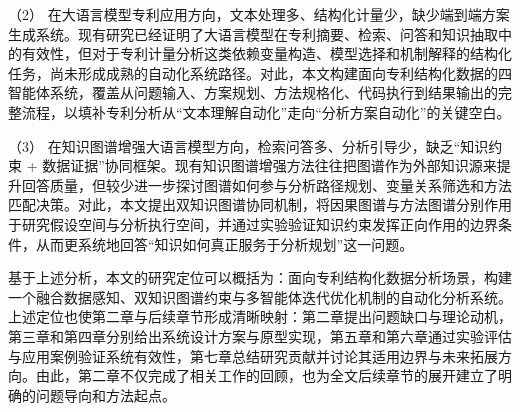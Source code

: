 （2） 在大语言模型专利应用方向，文本处理多、结构化计量少，缺少端到端方案生成系统。现有研究已经证明了大语言模型在专利摘要、检索、问答和知识抽取中的有效性，但对于专利计量分析这类依赖变量构造、模型选择和机制解释的结构化任务，尚未形成成熟的自动化系统路径。对此，本文构建面向专利结构化数据的四智能体系统，覆盖从问题输入、方案规划、方法规格化、代码执行到结果输出的完整流程，以填补专利分析从“文本理解自动化”走向“分析方案自动化”的关键空白。

（3） 在知识图谱增强大语言模型方向，检索问答多、分析引导少，缺乏“知识约束 + 数据证据”协同框架。现有知识图谱增强方法往往把图谱作为外部知识源来提升回答质量，但较少进一步探讨图谱如何参与分析路径规划、变量关系筛选和方法匹配决策。对此，本文提出双知识图谱协同机制，将因果图谱与方法图谱分别作用于研究假设空间与分析执行空间，并通过实验验证知识约束发挥正向作用的边界条件，从而更系统地回答“知识如何真正服务于分析规划”这一问题。


基于上述分析，本文的研究定位可以概括为：面向专利结构化数据分析场景，构建一个融合数据感知、双知识图谱约束与多智能体迭代优化机制的自动化分析系统。上述定位也使第二章与后续章节形成清晰映射：第二章提出问题缺口与理论动机，第三章和第四章分别给出系统设计方案与原型实现，第五章和第六章通过实验评估与应用案例验证系统有效性，第七章总结研究贡献并讨论其适用边界与未来拓展方向。由此，第二章不仅完成了相关工作的回顾，也为全文后续章节的展开建立了明确的问题导向和方法起点。
